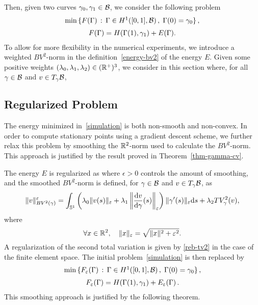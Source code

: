 Then, given two curves $\gamma_0, \gamma_1\in \mathcal{B}$, we consider the following  problem 
\begin{equation}\label{simulation}
\begin{array}{c}
	\min \,\{F(\GA)\,:\, \GA\in H^1([0,1],\Bb)\,,\; \GA(0)=\gm_0\}\,,\vspace{0.2cm}\\
	F(\GA) = H(\GA(1), \gm_1) + E(\GA).
\end{array}
\end{equation}
To allow for more flexibility in the numerical experiments, we introduce a weighted $BV^2$-norm in the definition~\eqref{energy-bv2} of the energy $E$. Given some positive weights $(\lambda_0,\lambda_1,\lambda_2) \in (\mathbb{R}^+)^3$,  we consider in this section 
where, for all $\gamma \in \mathcal{B}$ and $v \in T_\gamma \mathcal{B}$,  

\subsection{Regularized Problem }
\label{sec-regul-problem-gamma}

The energy minimized in~\eqref{simulation} is both non-smooth and non-convex. In order to compute stationary points using a gradient descent scheme, we further relax this problem by smoothing the $\mathbb{R}^2$-norm used to calculate the $BV^2$-norm. This approach is justified by the result proved  in Theorem~\ref{thm-gamma-cv}. 

The energy $E$ is regularized as
where $\epsilon>0$ controls the amount of smoothing, and the smoothed $BV^2$-norm is defined, for $\gamma \in \mathcal{B}$ and $v \in T_\gamma \mathcal{B}$, as
$$	
	\|v\|_{BV^2(\gamma)}^\varepsilon = \int_{\mathbb{S}^1}
		\left( 
			\lambda_0 \|v(s)\|_\varepsilon + 
			\lambda_1 \left\|\frac{\mathrm{d} v}{\mathrm{d} \gamma}(s)\right\|_\varepsilon 
		\right)\|\gamma'(s)\|_\varepsilon\mathrm{d} s + 
		\lambda_2 TV_{\gamma}^2(v), 
$$
where 
$$
	\forall x\in \mathbb{R}^2, \quad
	\|x\|_\varepsilon = \sqrt{\|x\|^2 + \varepsilon^2}.
$$ 
A regularization of the second total variation is given by \eqref{reb-tv2} in the case of the finite element space.
The initial problem~\eqref{simulation} is then replaced by 
\begin{equation}\label{simulation-reg}
\begin{array}{c}
	\min \,\{F_\epsilon(\GA)\,:\, \GA\in H^1([0,1],\Bb)\,,\; \GA(0)=\gm_0\}\,,\vspace{0.2cm}\\
F_\epsilon(\GA) = H(\GA(1), \gm_1) + E_\epsilon(\GA)\,.
\end{array}
\end{equation}
This smoothing approach is justified by the following theorem.


